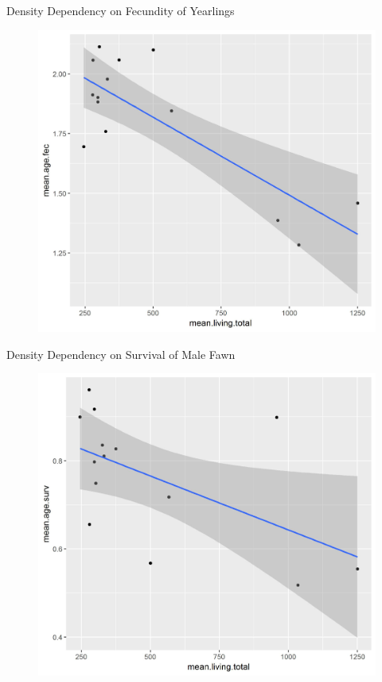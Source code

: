 \documentclass{beamer}
\begin{document}
\begin{frame}{Density Dependency on Fecundity of Yearlings}
	\begin{figure}[ht]
		\centering
		\includegraphics[scale=.45]{fig/Chicago_deer/DDfec_age1.jpg}
		\label{DDfec}
	\end{figure}
\end{frame}

\begin{frame}{Density Dependency on Survival of Male Fawn}
	\begin{figure}[ht]
		\centering
		\includegraphics[scale=.45]{fig/Chicago_deer/DDsurv_age9.jpg}
		\label{DDsurv}
	\end{figure}
\end{frame}
\end{document}
